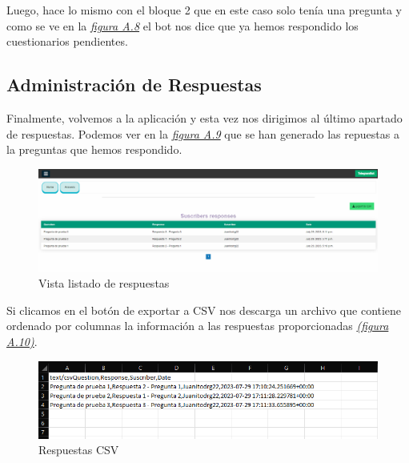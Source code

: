 Luego, hace lo mismo con el bloque 2 que en este caso solo tenía una pregunta y como se ve en la \textit{\hyperref[fig:cuestionario2]{figura A.8}} el bot nos dice que ya hemos respondido los cuestionarios pendientes. 

\subsection{Administración de Respuestas}

Finalmente, volvemos a la aplicación y esta vez nos dirigimos al último apartado de respuestas. Podemos ver en la \textit{\hyperref[fig:listado_respuestas]{figura A.9}} que se han generado las repuestas a la preguntas que hemos respondido. 

\begin{figure}[!ht]
    \centering
    \includegraphics[width=1\textwidth]{imagenes/list_respuestas_a.png}
    \caption{ Vista listado de respuestas }
    \label{fig:listado_respuestas}
\end{figure}\vspace{0.5cm}

Si clicamos en el botón de exportar a CSV nos descarga un archivo que contiene ordenado por columnas la información a las respuestas proporcionadas \textit{\hyperref[fig:respuestas-csv]{(figura A.10)}}. 

\begin{figure}[!ht]
    \centering
    \includegraphics[width=1\textwidth]{imagenes/respuestas_csv_a.png}
    \caption{ Respuestas CSV }
    \label{fig:respuestas-csv}
\end{figure}\vspace{0.5cm}